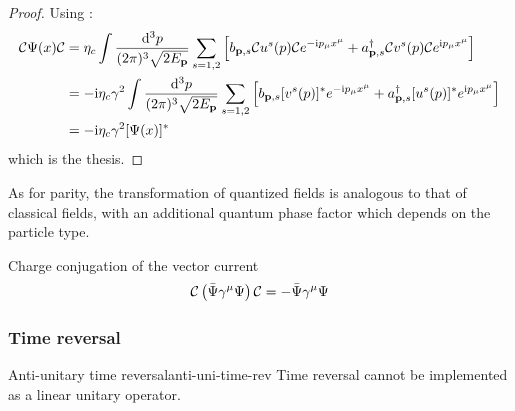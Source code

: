 \begin{proofbox}
  \begin{proof}
    Using :
    \begin{equation*}
      \begin{split}
        \mathcal{C} \Psi(x) \mathcal{C}
        &= \eta_c \int \frac{\mathrm{d}^3p}{(2\pi)^3 \sqrt{2E_{\mathbf{p}}}} \sum_{s = 1,2} \left[ b_{\mathbf{p},s} \mathcal{C} u^s(p) \mathcal{C} e^{-\mathrm{i} p_\mu x^\mu} + a_{\mathbf{p},s}^\dagger \mathcal{C} v^s(p) \mathcal{C} e^{\mathrm{i} p_\mu x^\mu} \right] \\
        &= -\mathrm{i} \eta_c \gamma^2 \int \frac{\mathrm{d}^3p}{(2\pi)^3 \sqrt{2E_{\mathbf{p}}}} \sum_{s = 1,2} \left[ b_{\mathbf{p},s} [v^s(p)]^* e^{-\mathrm{i} p_\mu x^\mu} + a_{\mathbf{p},s}^\dagger [u^s(p)]^* e^{\mathrm{i} p_\mu x^\mu} \right] \\
        & = -\mathrm{i} \eta_c \gamma^2 [\Psi(x)]^*
      \end{split}
    \end{equation*}
    which is the thesis.
  \end{proof}
\end{proofbox}

As for parity, the transformation of quantized fields is analogous to that of classical fields, with an additional quantum phase factor which depends on the particle type.

\begin{proposition}[before upper = {\tcbtitle}]{Charge conjugation of the vector current}{}
  \begin{equation}
    \mathcal{C} \left( \bar{\Psi} \gamma^\mu \Psi \right) \mathcal{C} = - \bar{\Psi} \gamma^\mu \Psi
    \label{eq:charge-conj-fermion-curr}
  \end{equation}
\end{proposition}

\subsubsection{Time reversal}

\begin{theorem}{Anti-unitary time reversal}{anti-uni-time-rev}
  Time reversal cannot be implemented as a linear unitary operator.
\end{theorem}

